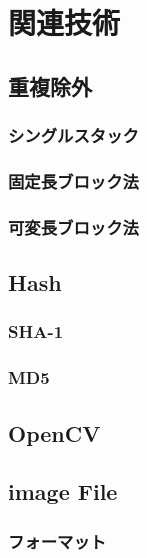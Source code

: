 \chapter{関連技術}

\section{重複除外}

\subsection{シングルスタック}

\subsection{固定長ブロック法}

\subsection{可変長ブロック法}


\section{Hash}

\subsection{SHA-1}

\subsection{MD5}

\section{OpenCV}

\section{image File}

\subsection{フォーマット}
